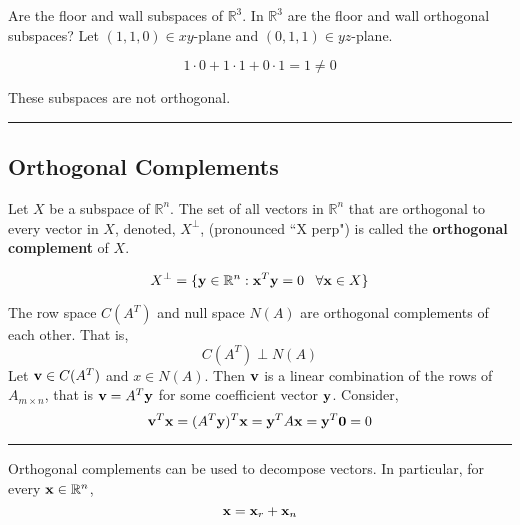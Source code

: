 \begin{example}
Are the floor and wall subspaces of $\mathbb{R}^3$.  In $\mathbb{R}^3$ are the floor and wall orthogonal subspaces?  Let $(1,1,0) \in xy$-plane and $(0,1,1) \in yz$-plane.  

\[  1 \cdot 0 + 1 \cdot 1 + 0 \cdot 1 = 1 \ne 0 \]

These subspaces are not orthogonal.
\end{example}

\rule[0.01in]{\textwidth}{0.0025in}



\subsection*{Orthogonal Complements}


 \begin{tcolorbox}[colback=yellow!10!,colframe=gray!15!]
 \begin{definition}
 Let $X$ be a subspace of $\mathbb{R}^n$.  The set of all vectors in $\mathbb{R}^n$ that are orthogonal to every vector in $X$, denoted, $X^\perp$, (pronounced ``X perp") is called the \textbf{orthogonal complement} of $X$.  
 
\[  X^\perp = \{ {\bf y} \in \mathbb{R}^n : {\bf x}^T {\bf y} = 0 \;\;\;  \forall {\bf x} \in X \} \]

 \end{definition}	 
 \end{tcolorbox} 




\begin{theorem}
The row space $C(A^T)$ and null space $N(A)$ are orthogonal complements of each other.  That is, 
\[  C(A^T) \perp N(A) \]
\proof Let ${\bf v} \in C(A^T)$ and $x \in N(A)$.  Then ${\bf v}$ is a linear combination of the rows of $A_{m \times n}$, that is ${\bf v} = A^T {\bf y}$ for some coefficient vector ${\bf y}$.  Consider, 
\[  {\bf v}^T {\bf x} = (A^T {\bf y})^T {\bf x} = {\bf y}^TA {\bf x} = {\bf y}^T {\bf 0} = {0} \]

\end{theorem}


\rule[0.01in]{\textwidth}{0.0025in}



Orthogonal complements can be used to decompose vectors.   In particular, for every ${\bf x} \in \mathbb{R}^n$, 
\[  {\bf x} = {\bf x}_r + {\bf x}_n \]




